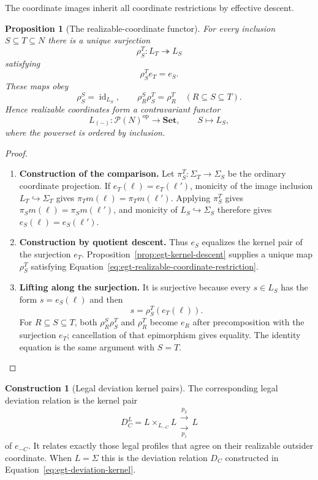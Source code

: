 \documentclass[11pt,a4paper]{article}
\numberwithin{equation}{section}
\newtheorem{proposition}[theorem]{Proposition}
\theoremstyle{definition}
\newtheorem{construction}[construction]{Construction}
\theoremstyle{remark}
\theoremstyle{plain}
\begin{document}
The coordinate images inherit all coordinate restrictions by effective
descent.

\begin{proposition}[The realizable-coordinate functor]
\label{prop:egt-realizable-coordinate-functor}
For every inclusion $S\subseteq T\subseteq N$ there is a unique surjection
\[
 \rho_S^T:L_T\twoheadrightarrow L_S
\]
satisfying
\begin{equation}
\label{eq:egt-realizable-coordinate-restriction}
 \rho_S^T e_T=e_S.
\end{equation}
These maps obey
\[
 \rho_S^S=\operatorname{id}_{L_S},
 \qquad
 \rho_R^S\rho_S^T=\rho_R^T
 \quad(R\subseteq S\subseteq T).
\]
Hence realizable coordinates form a contravariant functor
\[
 L_{(-)}:\mathcal P(N)^{\mathrm{op}}\longrightarrow\mathbf{Set},
 \qquad S\longmapsto L_S,
\]
where the powerset is ordered by inclusion.
\end{proposition}
\begin{proof}
\leavevmode
\begin{enumerate}[label=\textup{(\arabic*)},leftmargin=*,itemsep=4pt,topsep=3pt]
  \item \textbf{Construction of the comparison.} Let $\pi_S^T:\Sigma_T\to\Sigma_S$ be the ordinary coordinate projection. If $e_T(\ell)=e_T(\ell')$, monicity of the image inclusion
$L_T\hookrightarrow\Sigma_T$ gives
$\pi_Tm(\ell)=\pi_Tm(\ell')$. Applying $\pi_S^T$ gives
$\pi_Sm(\ell)=\pi_Sm(\ell')$, and monicity of
$L_S\hookrightarrow\Sigma_S$ therefore gives
$e_S(\ell)=e_S(\ell')$.
  \item \textbf{Construction by quotient descent.} Thus $e_S$ equalizes the kernel pair of the
surjection $e_T$. Proposition~\ref{prop:egt-kernel-descent} supplies a unique
map $\rho_S^T$ satisfying
Equation~\eqref{eq:egt-realizable-coordinate-restriction}.
  \item \textbf{Lifting along the surjection.} It is surjective because every $s\in L_S$ has the form $s=e_S(\ell)$ and
then
\[
 s=\rho_S^T(e_T(\ell)).
\]
For $R\subseteq S\subseteq T$, both $\rho_R^S\rho_S^T$ and $\rho_R^T$
become $e_R$ after precomposition with the surjection $e_T$; cancellation of
that epimorphism gives equality. The identity equation is the same argument
with $S=T$.
\end{enumerate}
\end{proof}

\begin{construction}[Legal deviation kernel pairs]
The corresponding legal deviation relation is the kernel pair
\begin{equation}
\label{eq:egt-legal-deviation}
 D_C^L=L\times_{L_{-C}}L
 \mathrel{\substack{\xrightarrow{p_2}\\[-2pt]
                     \xrightarrow[p_1]{}}}L
\end{equation}
of $e_{-C}$. It relates exactly those legal profiles that agree on their
realizable outsider coordinate. When $L=\Sigma$ this is the deviation
relation $D_C$ constructed in Equation~\eqref{eq:egt-deviation-kernel}.
\end{construction}
\end{document}
